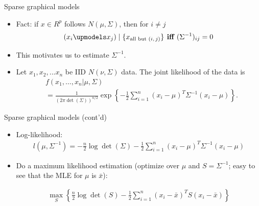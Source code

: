 \documentclass[12pt, trans]{beamer}
\newcommand{\1}[1]{{\mathbf 1}\left\{#1\right\}}        %
\def\lp{\left(}
\def\rp{\right)}
\begin{document}
\begin{frame}[fragile]{Sparse graphical models}

\begin{itemize}[<+->]
\item Fact: if $x\in R^p$ follows $N(\mu,\Sigma)$, then for $i\ne j$
\begin{align*}
(x_i  \upmodels %
x_j )\mid \{x_{\text{all but $(i,j)$}}\} \textbf{ iff } (\Sigma^{-1})_{ij}=0
\end{align*}
\item This motivates us to estimate $\Sigma^{-1}$.
\item Let $x_1,x_2,...x_n$ be IID $N(\nu,\Sigma)$ data. The joint likelihood of the data is
\begin{align*}
& f(x_1, \dots, x_n|\mu,\Sigma) 
\\&= \frac{1}{(2\pi \det\lp \Sigma\rp)^{n/2}}\exp\left\{ -\frac{1}{2} \sum_{i=1}^n(x_i-\mu)^T\Sigma^{-1}(x_i-\mu) \right\}.
\end{align*}

\end{itemize}

\end{frame}


\begin{frame}[fragile]{Sparse graphical models (cont'd)}

\begin{itemize}[<+->]
\item  Log-likelihood:
\begin{align*}
l(\mu,\Sigma^{-1}) = -\frac{n}{2}\log \det \lp \Sigma \rp  -\frac{1}{2} \sum_{i=1}^n(x_i-\mu)^T\Sigma^{-1}(x_i-\mu)
\end{align*}

\item Do a maximum likelihood estimation (optimize over $\mu$ and $S = \Sigma^{-1}$; easy to see that the MLE for $\mu$ is $\bar{x}$):

\begin{align*}
\max_S\left\{  \frac{n}{2}\log \det\lp S \rp  -\frac{1}{2} \sum_{i=1}^n(x_i-\bar{x})^T S (x_i-\bar{x})\right\} 
\end{align*}


\end{itemize}

\end{frame}
\end{document}
